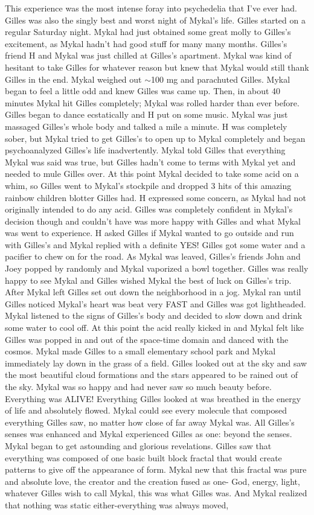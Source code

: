 \documentclass[12pt]{book}
\begin{document}
This experience was the most intense foray into psychedelia that I've ever had. Gilles was also the singly best and worst night of Mykal's life. Gilles started on a regular Saturday night. Mykal had just obtained some great molly to Gilles's excitement, as Mykal hadn't had good stuff for many many months. Gilles's friend H and Mykal was just chilled at Gilles's apartment. Mykal was kind of hesitant to take Gilles for whatever reason but knew that Mykal would still thank Gilles in the end. Mykal weighed out $\sim$100 mg and parachuted Gilles. Mykal began to feel a little odd and knew Gilles was came up. Then, in about 40 minutes Mykal hit Gilles completely; Mykal was rolled harder than ever before. Gilles began to dance ecstatically and H put on some music. Mykal was just massaged Gilles's whole body and talked a mile a minute. H was completely sober, but Mykal tried to get Gilles's to open up to Mykal completely and began psychoanalyzed Gilles's life inadvertently. Mykal told Gilles that everything Mykal was said was true, but Gilles hadn't come to terms with Mykal yet and needed to mule Gilles over. At this point Mykal decided to take some acid on a whim, so Gilles went to Mykal's stockpile and dropped 3 hits of this amazing rainbow children blotter Gilles had. H expressed some concern, as Mykal had not originally intended to do any acid. Gilles was completely confident in Mykal's decision though and couldn't have was more happy with Gilles and what Mykal was went to experience. H asked Gilles if Mykal wanted to go outside and run with Gilles's and Mykal replied with a definite YES! Gilles got some water and a pacifier to chew on for the road. As Mykal was leaved, Gilles's friends John and Joey popped by randomly and Mykal vaporized a bowl together. Gilles was really happy to see Mykal and Gilles wished Mykal the best of luck on Gilles's trip. After Mykal left Gilles set out down the neighborhood in a jog. Mykal ran until Gilles noticed Mykal's heart was beat very FAST and Gilles was got lightheaded. Mykal listened to the signs of Gilles's body and decided to slow down and drink some water to cool off. At this point the acid really kicked in and Mykal felt like Gilles was popped in and out of the space-time domain and danced with the cosmos. Mykal made Gilles to a small elementary school park and Mykal immediately lay down in the grass of a field. Gilles looked out at the sky and saw the most beautiful cloud formations and the stars appeared to be rained out of the sky. Mykal was so happy and had never saw so much beauty before. Everything was ALIVE! Everything Gilles looked at was breathed in the energy of life and absolutely flowed. Mykal could see every molecule that composed everything Gilles saw, no matter how close of far away Mykal was. All Gilles's senses was enhanced and Mykal experienced Gilles as one: beyond the senses. Mykal began to get astounding and glorious revelations. Gilles saw that everything was composed of one basic built block fractal that would create patterns to give off the appearance of form. Mykal new that this fractal was pure and absolute love, the creator and the creation fused as one- God, energy, light, whatever Gilles wish to call Mykal, this was what Gilles was. And Mykal realized that nothing was static either-everything was always moved, 
\end{document}
